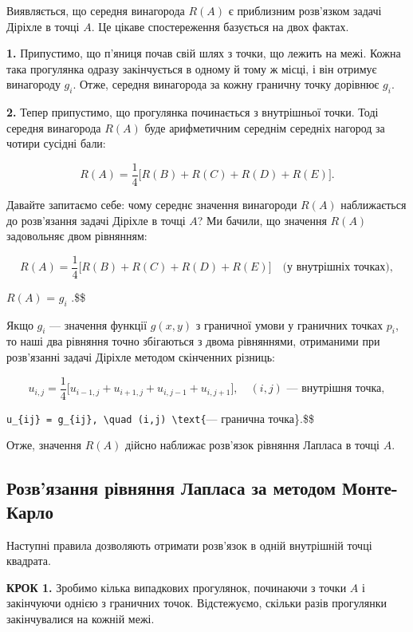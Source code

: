 \documentclass[
  ukrainian,
]{article}
\begin{document}
Виявляється, що середня винагорода \(R(A)\) є приблизним розв'язком
задачі Діріхле в точці \(A\). Це цікаве спостереження базується на двох
фактах.

\textbf{1.} Припустимо, що п'яниця почав свій шлях з точки, що лежить на
межі. Кожна така прогулянка одразу закінчується в одному й тому ж місці,
і він отримує винагороду \(g_i\). Отже, середня винагорода за кожну
граничну точку дорівнює \(g_i\).

\textbf{2.} Тепер припустимо, що прогулянка починається з внутрішньої
точки. Тоді середня винагорода \(R(A)\) буде арифметичним середнім
середніх нагород за чотири сусідні бали:

\[
R(A) = \frac{1}{4}\bigl[R(B) + R(C) + R(D) + R(E)\bigr].
\]

Давайте запитаємо себе: чому середнє значення винагороди \(R(A)\)
наближається до розв'язання задачі Діріхле в точці \(A\)? Ми бачили, що
значення \(R(A)\) задовольняє двом рівнянням:

\[
R(A) = \frac{1}{4}\bigl[R(B) + R(C) + R(D) + R(E)\bigr] \quad \text{(у внутрішніх точках)},
\]

\(R(A)\) = \(g_i\) \quad {}.\$\$

Якщо \(g_i\) --- значення функції \(g(x, y)\) з граничної умови у
граничних точках \(p_i\), то наші два рівняння точно збігаються з двома
рівняннями, отриманими при розв'язанні задачі Діріхле методом скінченних
різниць:

\[
u_{i,j} = \frac{1}{4}\bigl[u_{i-1,j} + u_{i+1,j} + u_{i,j-1} + u_{i,j+1}\bigr], \quad (i,j) \text{ — внутрішня точка},
\]

\texttt{u\_\{ij\}\ =\ g\_\{ij\},\ \textbackslash{}quad\ (i,j)\ \textbackslash{}text\{}---
гранична точка\}.\$\$

Отже, значення \(R(A)\) дійсно наближає розв'язок рівняння Лапласа в
точці \(A\).

\subsection{Розв'язання рівняння Лапласа за методом
Монте-Карло}\label{ux440ux43eux437ux432ux44fux437ux430ux43dux43dux44f-ux440ux456ux432ux43dux44fux43dux43dux44f-ux43bux430ux43fux43bux430ux441ux430-ux437ux430-ux43cux435ux442ux43eux434ux43eux43c-ux43cux43eux43dux442ux435-ux43aux430ux440ux43bux43e}

Наступні правила дозволяють отримати розв'язок в одній внутрішній точці
квадрата.

\textbf{КРОК 1.} Зробимо кілька випадкових прогулянок, починаючи з точки
\(A\) і закінчуючи однією з граничних точок. Відстежуємо, скільки разів
прогулянки закінчувалися на кожній межі.
\end{document}
